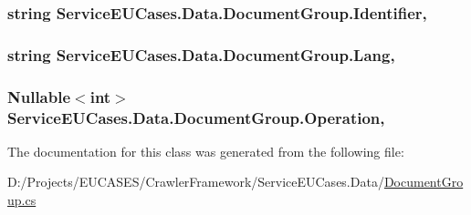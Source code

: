 \hypertarget{class_service_e_u_cases_1_1_data_1_1_document_group_aee93d37f33a02be303698169503eb3d9}{
\subsubsection[{Identifier}]{\setlength{\rightskip}{0pt plus 5cm}string Service\-E\-U\-Cases.\-Data.\-Document\-Group.\-Identifier\hspace{0.3cm}{\ttfamily [get]}, {\ttfamily [set]}}}\label{class_service_e_u_cases_1_1_data_1_1_document_group_aee93d37f33a02be303698169503eb3d9}
\hypertarget{class_service_e_u_cases_1_1_data_1_1_document_group_a9376234d7a13be0f01a9a0a7e0430bc8}{
\subsubsection[{Lang}]{\setlength{\rightskip}{0pt plus 5cm}string Service\-E\-U\-Cases.\-Data.\-Document\-Group.\-Lang\hspace{0.3cm}{\ttfamily [get]}, {\ttfamily [set]}}}\label{class_service_e_u_cases_1_1_data_1_1_document_group_a9376234d7a13be0f01a9a0a7e0430bc8}
\hypertarget{class_service_e_u_cases_1_1_data_1_1_document_group_aab4a707e55c810455fbea40bced3d485}{
\subsubsection[{Operation}]{\setlength{\rightskip}{0pt plus 5cm}Nullable$<$int$>$ Service\-E\-U\-Cases.\-Data.\-Document\-Group.\-Operation\hspace{0.3cm}{\ttfamily [get]}, {\ttfamily [set]}}}\label{class_service_e_u_cases_1_1_data_1_1_document_group_aab4a707e55c810455fbea40bced3d485}


The documentation for this class was generated from the following file\-:\begin{DoxyCompactItemize}
\item 
D\-:/\-Projects/\-E\-U\-C\-A\-S\-E\-S/\-Crawler\-Framework/\-Service\-E\-U\-Cases.\-Data/\hyperlink{_service_e_u_cases_8_data_2_document_group_8cs}{Document\-Group.\-cs}\end{DoxyCompactItemize}
